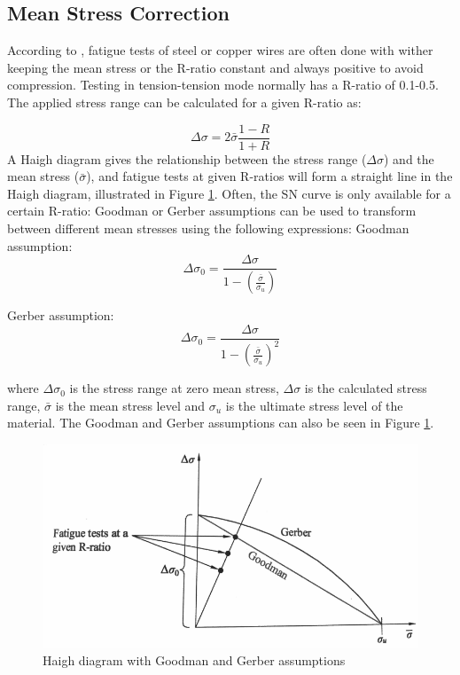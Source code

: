 \subsection{Mean Stress Correction}
According to \cite{Savik2016}, fatigue tests of steel or copper wires are often done with wither keeping the mean stress or the R-ratio constant and always positive to avoid compression. Testing in tension-tension mode normally has a R-ratio of 0.1-0.5. The applied stress range can be calculated for a given R-ratio as:

\begin{equation}
    \Delta \sigma = 2 \bar{\sigma} \frac{1-R}{1+R}
\end{equation}
A Haigh diagram gives the relationship between the stress range ($\Delta \sigma$) and the mean stress ($\bar{\sigma}$),  and fatigue tests at given R-ratios will form a straight line in the Haigh diagram, illustrated in Figure \ref{fig:gerber}. Often, the SN curve is only available for a certain R-ratio: Goodman or Gerber assumptions can be used to transform between different mean stresses using the following expressions:\newline
\newline
\noindent Goodman assumption:
\begin{equation}
    \Delta \sigma_0 = \frac{\Delta \sigma}{1-(\frac{\bar{\sigma}}{\sigma_u})}
\end{equation}

\noindent Gerber assumption:
\begin{equation}
    \Delta \sigma_0 = \frac{\Delta \sigma}{1-(\frac{\bar{\sigma}}{\sigma_u})^2}
\end{equation}

\noindent where $\Delta \sigma_0$ is the stress range at zero mean stress, $\Delta \sigma$ is the calculated stress range, $\bar{\sigma}$ is the mean stress level and $\sigma_u$ is the ultimate stress level of the material. The Goodman and Gerber assumptions can also be seen in Figure \ref{fig:gerber}. 

\begin{figure}[H]
\centering
\includegraphics[scale=0.6]{figures/gerber}
\caption[$\; \:$Haigh diagram with Goodman and Gerber assumptions]{Haigh diagram with Goodman and Gerber assumptions \cite{Savik2016} }
 \label{fig:gerber}
\end{figure}

